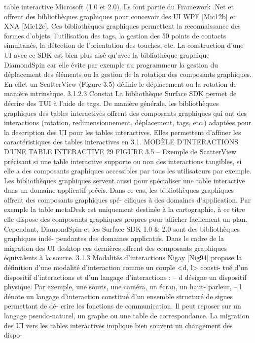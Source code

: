 \documentclass{article}
\begin{document}
table interactive Microsoft (1.0 et 2.0). Ils font partie du Framework .Net et offrent des bibliothèques
graphiques pour concevoir des UI WPF [Mic12b] et XNA [Mic12c]. Ces bibliothèques graphiques
permettent la reconnaissance des formes d’objets, l’utilisation des tags, la gestion des 50 points de
contacts simultanés, la détection de l’orientation des touches, etc. La construction d’une UI avec ce
SDK est bien plus aisé qu’avec la bibliothèque graphique DiamondSpin car elle évite par exemple
au programmeur la gestion du déplacement des éléments ou la gestion de la rotation des composants
graphiques. En effet un ScatterView (Figure 3.5) déﬁnie le déplacement ou la rotation de manière
intrinsèque.
3.1.2.3
Constat
La bibliothèque Surface SDK permet de décrire des TUI à l’aide de tags. De manière générale,
les bibliothèques graphiques des tables interactives offrent des composants graphiques qui ont des
interactions (rotation, redimensionnement, déplacement, tags, etc.) adaptées pour la description des
UI pour les tables interactives. Elles permettent d’afﬁner les caractéristiques des tables interactives en
3.1. MODÈLE D’INTERACTIONS D’UNE TABLE INTERACTIVE
29
FIGURE 3.5 – Exemple de ScatterView
précisant si une table interactive supporte ou non des interactions tangibles, si elle a des composants
graphiques accessibles par tous les utilisateurs par exemple.
Les bibliothèques graphiques servent aussi pour spécialiser une table interactive dans un domaine
applicatif précis. Dans ce cas, les bibliothèques graphiques offrent des composants graphiques spé-
ciﬁques à des domaines d’application. Par exemple la table metaDesk est uniquement destinée à la
cartographie, à ce titre elle dispose des composants graphiques propres pour afﬁcher facilement un
plan. Cependant, DiamondSpin et les Surface SDK 1.0 & 2.0 sont des bibliothèques graphiques indé-
pendantes des domaines applicatifs. Dans le cadre de la migration des UI desktop ces dernières offrent
des composants graphiques équivalents à la source.
3.1.3
Modalités d’interactions
Nigay [Nig94] propose la déﬁnition d’une modalité d’interaction comme un couple <d, l> consti-
tué d’un dispositif d’interactions et d’un langage d’interactions :
– d désigne un dispositif physique. Par exemple, une souris, une caméra, un écran, un haut-
parleur,
– l dénote un langage d’interaction constitué d’un ensemble structuré de signes permettant de dé-
crire les fonctions de communication. Il peut reposer sur un langage pseudo-naturel, un graphe
ou une table de correspondance.
La migration des UI vers les tables interactives implique bien souvent un changement des dispo-
\end{document}
